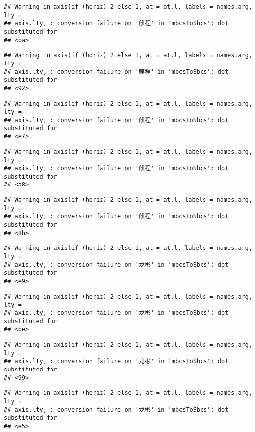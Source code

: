 \documentclass[
]{article}
\begin{document}
\begin{verbatim}
## Warning in axis(if (horiz) 2 else 1, at = at.l, labels = names.arg, lty =
## axis.lty, : conversion failure on '麒程' in 'mbcsToSbcs': dot substituted for
## <ba>
\end{verbatim}

\begin{verbatim}
## Warning in axis(if (horiz) 2 else 1, at = at.l, labels = names.arg, lty =
## axis.lty, : conversion failure on '麒程' in 'mbcsToSbcs': dot substituted for
## <92>
\end{verbatim}

\begin{verbatim}
## Warning in axis(if (horiz) 2 else 1, at = at.l, labels = names.arg, lty =
## axis.lty, : conversion failure on '麒程' in 'mbcsToSbcs': dot substituted for
## <e7>
\end{verbatim}

\begin{verbatim}
## Warning in axis(if (horiz) 2 else 1, at = at.l, labels = names.arg, lty =
## axis.lty, : conversion failure on '麒程' in 'mbcsToSbcs': dot substituted for
## <a8>
\end{verbatim}

\begin{verbatim}
## Warning in axis(if (horiz) 2 else 1, at = at.l, labels = names.arg, lty =
## axis.lty, : conversion failure on '麒程' in 'mbcsToSbcs': dot substituted for
## <8b>
\end{verbatim}

\begin{verbatim}
## Warning in axis(if (horiz) 2 else 1, at = at.l, labels = names.arg, lty =
## axis.lty, : conversion failure on '龙彬' in 'mbcsToSbcs': dot substituted for
## <e9>
\end{verbatim}

\begin{verbatim}
## Warning in axis(if (horiz) 2 else 1, at = at.l, labels = names.arg, lty =
## axis.lty, : conversion failure on '龙彬' in 'mbcsToSbcs': dot substituted for
## <be>
\end{verbatim}

\begin{verbatim}
## Warning in axis(if (horiz) 2 else 1, at = at.l, labels = names.arg, lty =
## axis.lty, : conversion failure on '龙彬' in 'mbcsToSbcs': dot substituted for
## <99>
\end{verbatim}

\begin{verbatim}
## Warning in axis(if (horiz) 2 else 1, at = at.l, labels = names.arg, lty =
## axis.lty, : conversion failure on '龙彬' in 'mbcsToSbcs': dot substituted for
## <e5>
\end{verbatim}
\end{document}
